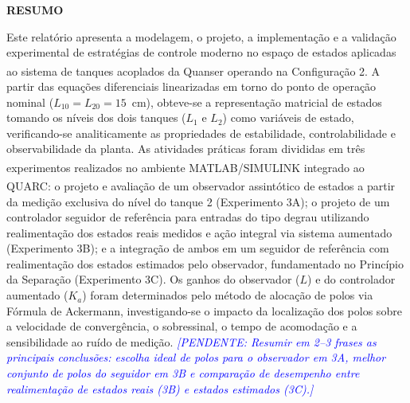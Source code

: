 \documentclass[a4paper,12pt]{article}
\newcommand{\pendente}[1]{\textcolor{blue}{\textit{[PENDENTE: #1]}}}
\newcommand{\pendente}[1]{}
\begin{document}
\newpage


\thispagestyle{empty}

\begin{center}
{\large \textbf{RESUMO}}
\end{center}

\vspace{3cm}

\vspace{\baselineskip}

\begin{justify}
    \hspace{4ex}Este relatório apresenta a modelagem, o projeto, a implementação e a validação experimental de estratégias de controle moderno no espaço de estados aplicadas ao sistema de tanques acoplados da Quanser\textsuperscript{\textregistered} operando na Configuração 2. A partir das equações diferenciais linearizadas em torno do ponto de operação nominal ($L_{10} = L_{20} = 15$~cm), obteve-se a representação matricial de estados tomando os níveis dos dois tanques ($L_1$ e $L_2$) como variáveis de estado, verificando-se analiticamente as propriedades de estabilidade, controlabilidade e observabilidade da planta. As atividades práticas foram divididas em três experimentos realizados no ambiente MATLAB\textsuperscript{\textregistered}/SIMULINK\textsuperscript{\textregistered} integrado ao QUARC\textsuperscript{\textregistered}: o projeto e avaliação de um observador assintótico de estados a partir da medição exclusiva do nível do tanque 2 (Experimento 3A); o projeto de um controlador seguidor de referência para entradas do tipo degrau utilizando realimentação dos estados reais medidos e ação integral via sistema aumentado (Experimento 3B); e a integração de ambos em um seguidor de referência com realimentação dos estados estimados pelo observador, fundamentado no Princípio da Separação (Experimento 3C). Os ganhos do observador ($L$) e do controlador aumentado ($K_a$) foram determinados pelo método de alocação de polos via Fórmula de Ackermann, investigando-se o impacto da localização dos polos sobre a velocidade de convergência, o sobressinal, o tempo de acomodação e a sensibilidade ao ruído de medição. \pendente{Resumir em 2--3 frases as principais conclusões: escolha ideal de polos para o observador em 3A, melhor conjunto de polos do seguidor em 3B e comparação de desempenho entre realimentação de estados reais (3B) e estados estimados (3C).}
\end{justify}
\end{document}
